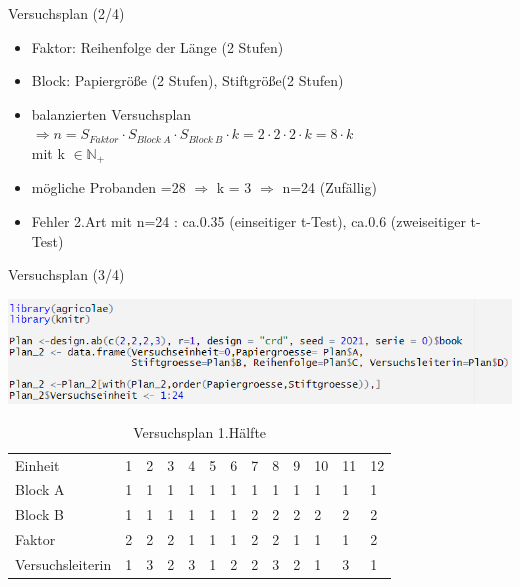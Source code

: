 \documentclass[ ngerman, fontsize= 10pt, headings=big, titlepage=true, xcolor=dvipsnames]{beamer}
\begin{document}
\begin{frame}{Versuchsplan (2/4)}
	
	
	\begin{itemize}
		\item Faktor: Reihenfolge der Länge (2 Stufen)
		\item Block: Papiergröße (2 Stufen), Stiftgröße(2 Stufen)	
		\item balanzierten Versuchsplan\\
		 $\Rightarrow n = S_{Faktor} \cdot S_{Block\ A} \cdot  S_{Block\ B} \cdot k =2 \cdot 2\cdot 2\cdot k = 8\cdot k$ \\
		 mit k $\in \mathbb{N}_+$
		
		\item mögliche Probanden =28 $\Rightarrow$ k = 3 $\Rightarrow$ n=24 (Zufällig)
		\item Fehler 2.Art mit n=24 : ca.0.35 (einseitiger t-Test), ca.0.6 (zweiseitiger t-Test)
		
		
	\end{itemize}
	
\end{frame}
\begin{frame}{Versuchsplan (3/4)}
	
\includegraphics[scale=0.7]{Code_Versuchsplan.png}

{\small
\begin{table}[hb]
	\caption{Versuchsplan 1.Hälfte}
	\centering
	\begin{tabular}[b]{l||l|l|l|l|l|l|l|l|l|l|l|l}
		\hline
		Einheit & 1 & 2 & 3 & 4 & 5 & 6 & 7 & 8 & 9 & 10 & 11 & 12\\
		\hhline{=============}
		Block A & 1 & 1 & 1 & 1 & 1 & 1 & 1 & 1 & 1 & 1 & 1 & 1\\
		\hline
		Block B & 1 & 1 & 1 & 1 & 1 & 1 & 2 & 2 & 2 & 2 & 2 & 2\\
		\hline
		Faktor & 2 & 2 & 2 & 1 & 1 & 1 & 2 & 2 & 1 & 1 & 1 & 2\\
		\hhline{=============}
		{\tiny Versuchsleiterin} & 1 & 3 & 2 & 3 & 1 & 2 & 2 & 3 & 2 & 1 & 3 & 1\\
		\hline
	\end{tabular}
\end{table}}

\end{frame}
\end{document}
